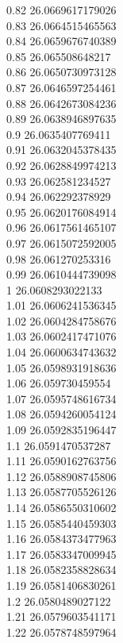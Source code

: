 {0.82	26.0669617179026\\
0.83	26.0664515465563\\
0.84	26.0659676740389\\
0.85	26.065508648217\\
0.86	26.0650730973128\\
0.87	26.0646597254461\\
0.88	26.0642673084236\\
0.89	26.0638946897635\\
0.9	26.0635407769411\\
0.91	26.0632045378435\\
0.92	26.0628849974213\\
0.93	26.062581234527\\
0.94	26.062292378929\\
0.95	26.0620176084914\\
0.96	26.0617561465107\\
0.97	26.0615072592005\\
0.98	26.061270253316\\
0.99	26.0610444739098\\
1	26.0608293022133\\
1.01	26.0606241536345\\
1.02	26.0604284758676\\
1.03	26.0602417471076\\
1.04	26.0600634743632\\
1.05	26.0598931918636\\
1.06	26.059730459554\\
1.07	26.0595748616734\\
1.08	26.0594260054124\\
1.09	26.0592835196447\\
1.1	26.0591470537287\\
1.11	26.0590162763756\\
1.12	26.0588908745806\\
1.13	26.0587705526126\\
1.14	26.0586550310602\\
1.15	26.0585440459303\\
1.16	26.0584373477963\\
1.17	26.0583347009945\\
1.18	26.0582358828634\\
1.19	26.0581406830261\\
1.2	26.0580489027122\\
1.21	26.0579603541171\\
1.22	26.0578748597964\\
}
